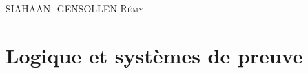 \documentclass[a4paper,french,bookmarks]{book}
\begin{document}
\begin{center}
\begin{minipage}{0.85\linewidth}
        \end{minipage}
    \end{center}
    
    \hfill{\large\textsc{SIAHAAN-{}-GENSOLLEN Rémy}}
    
    \pagestyle{intro}
    

    \dominitoc\nomtcrule 
    {\sffamily\tableofcontents}\mtcaddchapter\pagestyle{toc}
    
    
    
    \pagestyle{plain}
    
    \chapter{Logique et systèmes de preuve}
    
    
    
\end{document}
